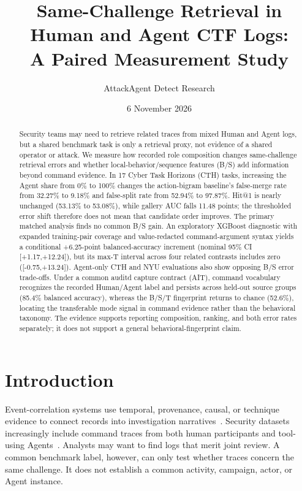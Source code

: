 \documentclass[10pt]{article}
\title{Same-Challenge Retrieval in Human and Agent CTF Logs:\\A Paired Measurement Study}
\author{AttackAgent Detect Research}
\date{6 November 2026}
\begin{document}
\maketitle

\begin{abstract}
Security teams may need to retrieve related traces from mixed Human and Agent logs, but a shared benchmark task is only a retrieval proxy, not evidence of a shared operator or attack. We measure how recorded role composition changes same-challenge retrieval errors and whether local-behavior/sequence features (B/S) add information beyond command evidence. In 17 Cyber Task Horizons (CTH) tasks, increasing the Agent share from 0\% to 100\% changes the action-bigram baseline's false-merge rate from 32.27\% to 9.18\% and false-split rate from 52.94\% to 97.87\%. Hit@1 is nearly unchanged (53.13\% to 53.08\%), while gallery AUC falls 11.48 points; the thresholded error shift therefore does not mean that candidate order improves. The primary matched analysis finds no common B/S gain. An exploratory XGBoost diagnostic with expanded training-pair coverage and value-redacted command-argument syntax yields a conditional +6.25-point balanced-accuracy increment (nominal 95\% CI [+1.17,+12.24]), but its max-T interval across four related contrasts includes zero ([-0.75,+13.24]). Agent-only CTH and NYU evaluations also show opposing B/S error trade-offs. Under a common auditd capture contract (AIT), command vocabulary recognizes the recorded Human/Agent label and persists across held-out source groups (85.4\% balanced accuracy), whereas the B/S/T fingerprint returns to chance (52.6\%), locating the transferable mode signal in command evidence rather than the behavioral taxonomy. The evidence supports reporting composition, ranking, and both error rates separately; it does not support a general behavioral-fingerprint claim.
\end{abstract}

\section{Introduction}
Event-correlation systems use temporal, provenance, causal, or technique evidence to connect records into investigation narratives~\cite{holmes,poirot,atlas,ostinato}. Security datasets increasingly include command traces from both human participants and tool-using Agents~\cite{cth,tang,nyu,ait}. Analysts may want to find logs that merit joint review. A common benchmark label, however, can only test whether traces concern the same challenge. It does not establish a common activity, campaign, actor, or Agent instance.
\end{document}
